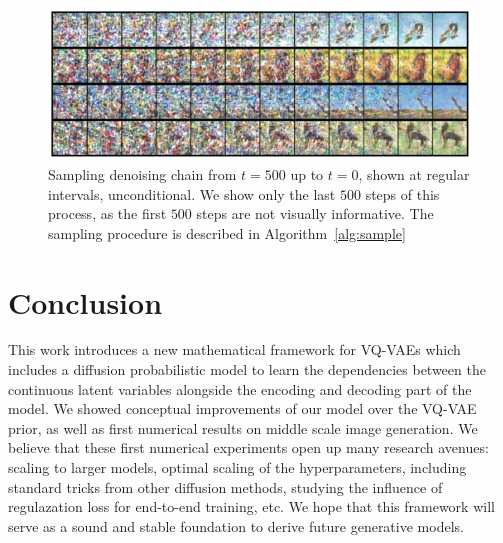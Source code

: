 \documentclass{article}
\theoremstyle{plain}
\theoremstyle{definition}
\theoremstyle{remark}
\begin{document}
\begin{figure}
    \centering
    \includegraphics[width=.8\linewidth]{./chains_unconditional.pdf}
    \caption{Sampling denoising chain from $t=500$ up to $t=0$, shown at regular intervals, unconditional. We show only the last $500$ steps of this process, as the first $500$ steps are not visually informative. The sampling procedure is described in Algorithm~\ref{alg:sample}}
    \label{fig:miniimagenet_prior_ours_chain_unconditional}
\end{figure}



\section{Conclusion}
This work introduces a new mathematical framework for VQ-VAEs which includes a diffusion probabilistic model to learn the dependencies between the continuous latent  variables alongside the encoding and decoding part of the model. We showed conceptual improvements of our model over the VQ-VAE prior, as well as first numerical results on middle scale image generation. We believe that these first numerical experiments open up many research avenues: scaling to larger models, optimal scaling of the hyperparameters, including standard tricks from other diffusion methods, studying the influence of regulazation loss for end-to-end training, etc. We hope that this framework will serve as a sound and stable foundation to derive future generative models.


\end{document}
